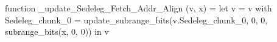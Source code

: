 function _update_Sedeleg_Fetch_Addr_Align (v, x) = let v = { v with Sedeleg_chunk_0 = update_subrange_bits(v.Sedeleg_chunk_0, 0, 0, subrange_bits(x, 0, 0)) } in
  v
